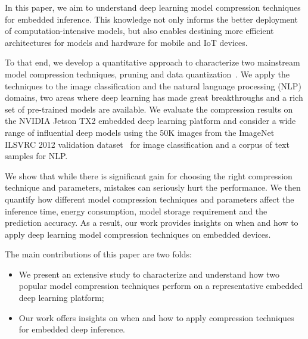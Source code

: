 In this paper, we aim to understand deep learning model compression techniques for embedded inference. This knowledge not only informs the
better deployment of computation-intensive models, but also enables destining more efficient architectures for models and hardware for
mobile and IoT devices.

To that end, we develop a quantitative approach  to characterize two mainstream model compression techniques,
pruning and data quantization~\cite{Gong2014Compressing}. We apply the techniques to the image
classification and the natural language processing (NLP) domains, two areas where deep learning has made great breakthroughs and a rich set
of pre-trained models are available. We evaluate the compression results on the NVIDIA Jetson TX2 embedded deep learning platform and
consider a wide range of influential deep models using the 50K images from the ImageNet ILSVRC 2012 validation dataset~\cite{imagenet2012}
for image classification and a corpus of  text samples\FIXME{~\cite{}} for NLP.


We show that while there is significant gain for choosing the right compression technique and parameters, mistakes can seriously hurt the
performance. We then quantify how different model compression techniques and parameters affect the inference time, energy consumption,
model storage requirement and the prediction accuracy. As a result, our work provides insights on when and how to apply deep learning model
compression techniques on embedded devices.

The main contributions of this paper are two folds:

\begin{itemize}
\item We present an extensive study to characterize and understand how two popular model compression techniques perform on a
    representative embedded deep learning platform;
\item Our work offers insights on when and how to apply compression techniques for embedded deep inference.
\end{itemize}
